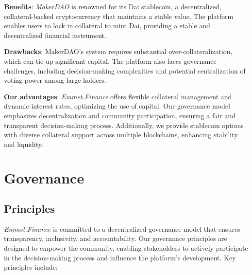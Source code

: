 \documentclass[12pt, a4paper]{article}
\begin{document}
\textbf{Benefits}: \textit{MakerDAO} is renowned for its Dai stablecoin, a decentralized, collateral-backed cryptocurrency that maintains a stable value. The platform enables users to lock in collateral to mint Dai, providing a stable and decentralized financial instrument.

\textbf{Drawbacks}: MakerDAO's system requires substantial over-collateralization, which can tie up significant capital. The platform also faces governance challenges, including decision-making complexities and potential centralization of voting power among large holders.

\textbf{Our advantages}: \textit{Emmet.Finance} offers flexible collateral management and dynamic interest rates, optimizing the use of capital. Our governance model emphasizes decentralization and community participation, ensuring a fair and transparent decision-making process. Additionally, we provide stablecoin options with diverse collateral support across multiple blockchains, enhancing stability and liquidity.

\section{Governance}

\subsection{Principles}

\textit{Emmet.Finance} is committed to a decentralized governance model that ensures transparency, inclusivity, and accountability. Our governance principles are designed to empower the community, enabling stakeholders to actively participate in the decision-making process and influence the platform's development. Key principles include:
\end{document}
